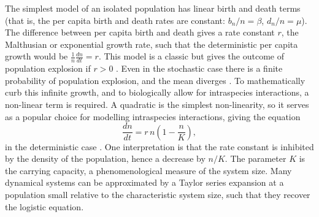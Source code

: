 The simplest model of an isolated population has linear birth and death terms (that is, the per capita birth and death rates are constant: $b_n/n=\beta$, $d_n/n=\mu$). 
The difference between per capita birth and death gives a rate constant $r$, the Malthusian or exponential growth rate, such that the deterministic per capita growth would be $\frac{1}{n}\frac{dn}{dt} = r$. %
This model is a classic but gives the outcome of population explosion if $r>0$ \cite{Malthus1798}. 
Even in the stochastic case there is a finite probability of population explosion, and the mean diverges \cite{Nisbet1982}. 
To mathematically curb this infinite growth, and to biologically allow for intraspecies interactions, a non-linear term is required. 
A quadratic is the simplest non-linearity, so it serves as a popular choice for modelling intraspecies interactions, giving the equation
\begin{equation}
\frac{dn}{dt} = r\,n\left(1-\frac{n}{K}\right),
\label{logistic}
\end{equation}
in the deterministic case \cite{Greenhalgh1990,Ovaskainen2010,Assaf2010,Allen2003a,Norden1982,Newman2004,Allen2005,Nasell2001}. %
One interpretation is that the rate constant is inhibited by the density of the population, hence a decrease by $n/K$. %
The parameter $K$ is the carrying capacity, a phenomenological measure of the system size. 
%
Many dynamical systems can be approximated by a Taylor series expansion at a population small relative to the characteristic system size, such that they recover the logistic equation. %
